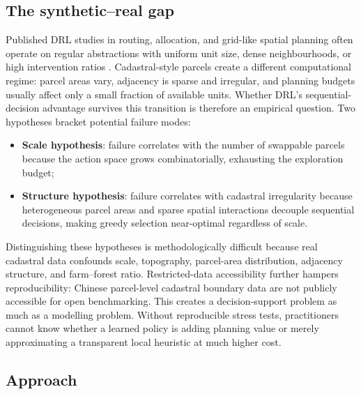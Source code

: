 \documentclass[]{interact}
\theoremstyle{plain}
\begin{document}
\subsection{The synthetic--real gap}

Published DRL studies in routing, allocation, and grid-like spatial planning often operate on regular abstractions with uniform unit size, dense neighbourhoods, or high intervention ratios \citep{bello2017neural,nazari2018reinforcement,kool2019attention,zheng2023spatial}. Cadastral-style parcels create a different computational regime: parcel areas vary, adjacency is sparse and irregular, and planning budgets usually affect only a small fraction of available units. Whether DRL's sequential-decision advantage survives this transition is therefore an empirical question. Two hypotheses bracket potential failure modes:

\begin{itemize}
\item \textbf{Scale hypothesis}: failure correlates with the number of swappable parcels because the action space grows combinatorially, exhausting the exploration budget;
\item \textbf{Structure hypothesis}: failure correlates with cadastral irregularity because heterogeneous parcel areas and sparse spatial interactions decouple sequential decisions, making greedy selection near-optimal regardless of scale.
\end{itemize}

Distinguishing these hypotheses is methodologically difficult because real cadastral data confounds scale, topography, parcel-area distribution, adjacency structure, and farm--forest ratio. Restricted-data accessibility further hampers reproducibility: Chinese parcel-level cadastral boundary data are not publicly accessible for open benchmarking. This creates a decision-support problem as much as a modelling problem. Without reproducible stress tests, practitioners cannot know whether a learned policy is adding planning value or merely approximating a transparent local heuristic at much higher cost.

\subsection{Approach}
\end{document}
